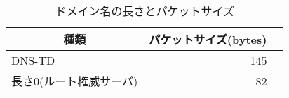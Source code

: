 \begin{table}[h]
 \caption{ドメイン名の長さとパケットサイズ}
 \centering
  \begin{tabular}{lrr}
    \toprule
		\multicolumn{1}{c}{\textbf{種類}} & \multicolumn{1}{c}{\textbf{パケットサイズ(bytes)}} \\
    \midrule
    DNS-TD & 145 \\
		長さ0(ルート権威サーバ) & 82 \\
    \bottomrule
  \end{tabular}
 \label{tab:length_size}
\end{table}
